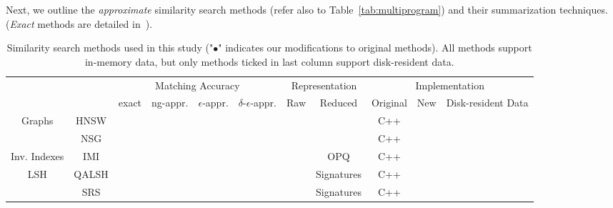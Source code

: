 Next, we outline the \emph{approximate} similarity search methods (refer also to Table~\ref{tab:multiprogram}) and their summarization techniques. 
(\emph{Exact} methods are detailed in~\cite{journal/pvldb/echihabi2018}).

\begin{table*}[tb]
		\caption{{\color{black}Similarity search methods used in this study} %
		("$\bullet$" indicates our modifications to original methods). {\color{black}All methods support in-memory data, but only methods ticked in last column support disk-resident data.}}
	{\small
		\centering
		\begin{tabular*}{\linewidth}{|*{11}{c|}} 
			\cline{3-11} 
			\multicolumn{1}{c}{}& & \multicolumn{4}{c|}{Matching Accuracy}  & %
			 \multicolumn{2}{|c|}{Representation} & \multicolumn{3}{c|}{Implementation}\\    		
			\cline{3-11} 
			\multicolumn{1}{c}{}& & exact & ng-appr. & $\epsilon$-appr. & $\delta$-$\epsilon$-appr. & Raw & Reduced & Original  & New & Disk-resident Data \\    		
			\cline{1-11}			 		 
			\cline{2-11}			 
			\multicolumn{1}{|c|}{\multirow{2}{*}{{Graphs}}}
			& \multicolumn{1}{c|}{HNSW} & 
			& \cite{journal/corr/malkov16} &   &  & \checkmark & & C++ &  &\\	
			\cline{2-11}			 	 
			& \multicolumn{1}{c|}{NSG} & 
			& \cite{nsg} &   &  & \checkmark & & C++ &  &\\	
			\cline{1-11}			 
			\multicolumn{1}{|c|}{\multirow{1}{*}{{Inv. Indexes}}}
			& \multicolumn{1}{c|}{IMI} &  & \cite{journal/pami/babenko15,journal/tpami/ge2014}  &  &  &  & OPQ & C++  & &\checkmark\\	
			\cline{1-11}			 	 
			\multicolumn{1}{|c|}{\multirow{2}{*}{{LSH}}}
			& \multicolumn{1}{c|}{QALSH} & &  & & \cite{qalsh} &   & Signatures & C++ & &\\	
			\cline{2-11}			 		 			
			& \multicolumn{1}{c|}{SRS} & & &  & \cite{conf/vldb/sun14} &  & Signatures & C++ & &\\				

\end{tabular*}}
\end{table*}
